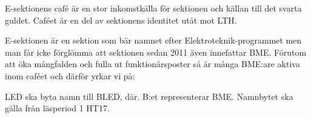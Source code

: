 \documentclass[../_main/handlingar.tex]{subfiles}
\begin{document}
E-sektionens café är en stor inkomstkälla för sektionen och källan till det svarta guldet. Caféet är en del av sektionens identitet utåt mot LTH.

E-sektionen är en sektion som bär namnet efter Elektroteknik-programmet men man får icke förglömma att sektionen sedan 2011 även innefattar BME. Förutom att öka mångfalden och fulla ut funktionärsposter så är många BME:are aktiva inom caféet och därför yrkar vi på:

\begin{attsatser}
    \att LED ska byta namn till BLED, där. B:et representerar BME. Namnbytet ska gälla från läsperiod 1 HT17.
\end{attsatser}

\begin{signatures}{1}
    \mvh
    \signature{Godtycklig BME:are}{}
\end{signatures}
\end{document}
